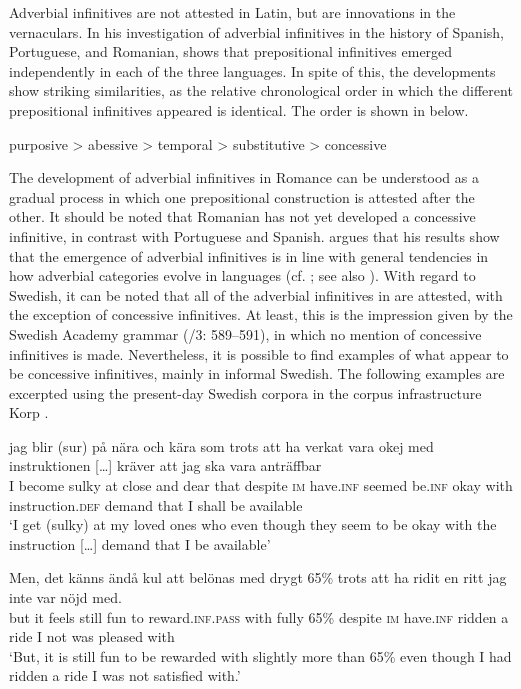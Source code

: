 \documentclass[output=paper]{langscibook}
\begin{document}
Adverbial infinitives are not attested in Latin, but are innovations in the vernaculars. In his investigation of adverbial infinitives in the history of Spanish, Portuguese, and Romanian, \citet{Schulte2007Prepositional,Schulte2007What} shows that prepositional infinitives emerged independently in each of the three languages. In spite of this, the developments show striking similarities, as the relative chronological order in which the different prepositional infinitives appeared is identical. The order is shown in  below. 


\ea \label{ex:kalm:6}
purposive > abessive > temporal > substitutive > concessive
\z

The development of adverbial infinitives in Romance can be understood as a gradual process in which one prepositional construction is attested after the other. It should be noted that Romanian has not yet developed a concessive infinitive, in contrast with Portuguese and Spanish. \citet{Schulte2007Prepositional} argues that his results show that the emergence of adverbial infinitives is in line with general tendencies in how adverbial categories evolve in languages (cf. \citealt{Cristofaro2005}; see also ). With regard to Swedish, it can be noted that all of the adverbial infinitives in  are attested, with the exception of concessive infinitives. At least, this is the impression given by the Swedish Academy grammar (\citealt{TelemanEtAl1999}/3: 589–591), in which no mention of concessive infinitives is made. Nevertheless, it is possible to find examples of what appear to be concessive infinitives, mainly in informal Swedish. The following examples are excerpted using the present-day Swedish corpora in the corpus infrastructure Korp \citep{BorinEtAl2012}. 


\ea
\label{ex:kalm:7}
\ea  \label{ex:kalm:7a}
\gll jag blir (sur) på nära och kära som trots att ha verkat vara okej med {instruktionen […]} kräver att jag ska vara anträffbar\\
I become sulky at close and dear that despite \textsc{im} have.\textsc{inf} seemed be.\textsc{inf} okay with instruction.\textsc{def} demand that I shall be available\\ 
\glt ‘I get (sulky) at my loved ones who even though they seem to be okay with the instruction […] demand that I be available’ \citep{Blogg2007}

\ex  \label{ex:kalm:7b}
\gll Men, det känns ändå kul att belönas med drygt 65\% trots att ha ridit en ritt jag inte var nöjd med.\\
but it feels still fun to reward.\textsc{inf.pass} with fully 65\% despite \textsc{im} have.\textsc{inf} ridden a ride I not was pleased with\\ 
\glt ‘But, it is still fun to be rewarded with slightly more than 65\% even though I had ridden a ride I was not satisfied with.’ \citep{Blogg2016}
\z 
\z 
\end{document}
